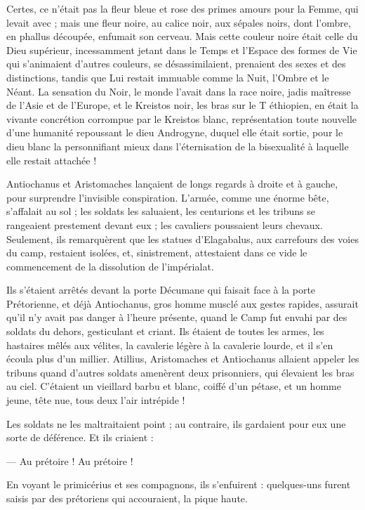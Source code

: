 \documentclass[a4paper, 11pt, oneside, polutonikogreek, french]{article}
\begin{document}
Certes, ce n'était pas la fleur bleue et rose des primes amours pour la Femme, qui levait avec ; mais une fleur noire, au calice noir, aux sépales noirs, dont l'ombre, en phallus découpée, enfumait son cerveau. Mais cette couleur noire était celle du Dieu supérieur, incessamment jetant dans le Temps et l'Espace des formes de Vie qui s'animaient d'autres couleurs, se désassimilaient, prenaient des sexes et des distinctions, tandis que Lui restait immuable comme la Nuit, l'Ombre et le Néant. La sensation du Noir, le monde l'avait dans la race noire, jadis maîtresse de l'Asie et de l'Europe, et le Kreistos noir, les bras sur le T éthiopien, en était la vivante concrétion corrompue par le Kreistos blanc, représentation toute nouvelle d'une humanité repoussant le dieu Androgyne, duquel elle était sortie, pour le dieu blanc la personnifiant mieux dans l'éternisation de la bisexualité à laquelle elle restait attachée !

Antiochanus et Aristomaches lançaient de longs regards à droite et à gauche, pour surprendre l'invisible conspiration. L'armée, comme une énorme bête, s'affalait au sol ; les soldats les saluaient, les centurions et les tribuns se rangeaient prestement devant eux ; les cavaliers poussaient leurs chevaux. Seulement, ils remarquèrent que les statues d'Elagabalus, aux carrefours des voies du camp, restaient isolées, et, sinistrement, attestaient dans ce vide le commencement de la dissolution de l'impérialat.

Ils s'étaient arrêtés devant la porte Décumane qui faisait face à la porte Prétorienne, et déjà Antiochanus, gros homme musclé aux gestes rapides, assurait qu'il n'y avait pas danger à l'heure présente, quand le Camp fut envahi par des soldats du dehors, gesticulant et criant. Ils étaient de toutes les armes, les hastaires mêlés aux vélites, la cavalerie légère à la cavalerie lourde, et il s'en écoula plus d'un millier. Atillius, Aristomaches et Antiochanus allaient appeler les tribuns quand d'autres soldats amenèrent deux prisonniers, qui élevaient les bras au ciel. C'étaient un vieillard barbu et blanc, coiffé d'un pétase, et un homme jeune, tête nue, tous deux l'air intrépide !

Les soldats ne les maltraitaient point ; au contraire, ils gardaient pour eux une sorte de déférence. Et ils criaient :

--- Au prétoire ! Au prétoire !

En voyant le primicérius et ses compagnons, ils s'enfuirent : quelques-uns furent saisis par des prétoriens qui accouraient, la pique haute.
\end{document}
